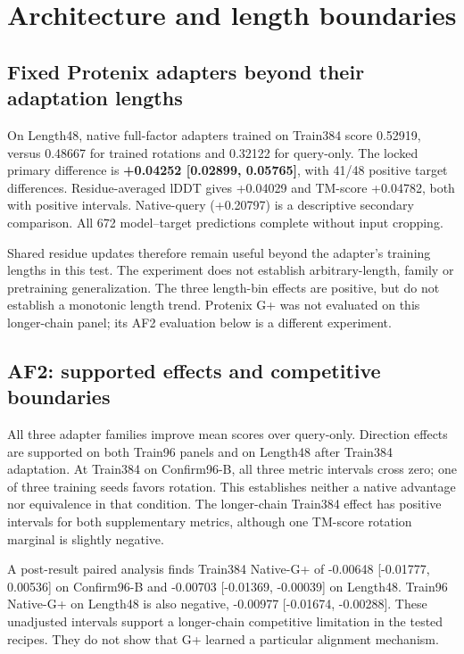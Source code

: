 \section{Architecture and length boundaries}
\label{sec:5}
\subsection{Fixed Protenix adapters beyond their adaptation lengths}\label{fixed-protenix-adapters-beyond-their-adaptation-lengths}

On Length48, native full-factor adapters trained on Train384 score 0.52919,
versus 0.48667 for trained rotations and 0.32122 for query-only. The locked
primary difference is \textbf{+0.04252 {[}0.02899, 0.05765{]}}, with 41/48 positive
target differences. Residue-averaged lDDT gives +0.04029 and TM-score +0.04782,
both with positive intervals. Native-query (+0.20797) is a descriptive secondary
comparison. All 672 model--target predictions complete without input cropping.

Shared residue updates therefore remain useful beyond the adapter's training
lengths in this test. The experiment does not establish arbitrary-length,
family or pretraining generalization. The three length-bin effects are positive,
but do not establish a monotonic length trend. Protenix G+ was not evaluated
on this longer-chain panel; its AF2 evaluation below is a different experiment.

\subsection{AF2: supported effects and competitive boundaries}\label{af2-supported-effects-and-competitive-boundaries}



All three adapter families improve mean scores over query-only. Direction
effects are supported on both Train96 panels and on Length48 after Train384
adaptation. At Train384 on Confirm96-B, all three metric intervals cross zero;
one of three training seeds favors rotation. This establishes neither a native
advantage nor equivalence in that condition. The longer-chain Train384 effect
has positive intervals for both supplementary metrics, although one TM-score
rotation marginal is slightly negative.

A post-result paired analysis finds Train384 Native-G+ of
-0.00648 {[}-0.01777, 0.00536{]} on Confirm96-B and
-0.00703 {[}-0.01369, -0.00039{]} on Length48. Train96 Native-G+ on Length48
is also negative, -0.00977 {[}-0.01674, -0.00288{]}. These unadjusted intervals
support a longer-chain competitive limitation in the tested recipes. They do
not show that G+ learned a particular alignment mechanism.

